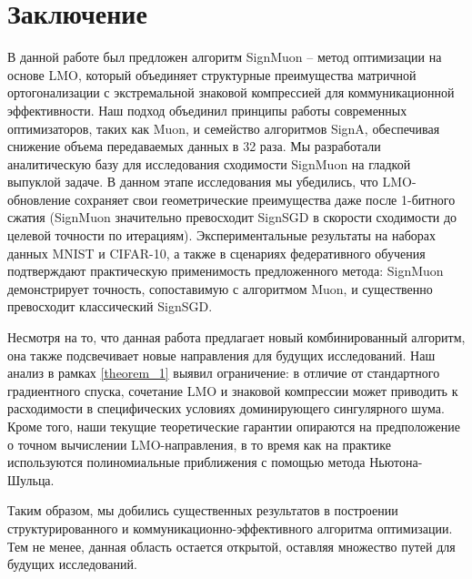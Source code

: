 \documentclass{article}
\begin{document}
\section{Заключение}
В данной работе был предложен алгоритм SignMuon -- метод оптимизации на основе LMO, который объединяет структурные преимущества матричной ортогонализации с экстремальной знаковой компрессией для коммуникационной эффективности. Наш подход объединил принципы работы современных оптимизаторов, таких как Muon, и семейство алгоритмов SignA, обеспечивая снижение объема передаваемых данных в 32 раза. Мы разработали аналитическую базу для исследования сходимости SignMuon на гладкой выпуклой задаче. В данном этапе исследования мы убедились, что LMO-обновление сохраняет свои геометрические преимущества даже после 1-битного сжатия (SignMuon значительно превосходит SignSGD в скорости сходимости до целевой точности по итерациям). Экспериментальные результаты на наборах данных MNIST и CIFAR-10, а также в сценариях федеративного обучения подтверждают практическую применимость предложенного метода: SignMuon демонстрирует точность, сопоставимую с алгоритмом Muon, и существенно превосходит классический SignSGD.

Несмотря на то, что данная работа предлагает новый комбинированный алгоритм, она также подсвечивает новые направления для будущих исследований. Наш анализ в рамках \cref{theorem_1} выявил ограничение: в отличие от стандартного градиентного спуска, сочетание LMO и знаковой компрессии может приводить к расходимости в специфических условиях доминирующего сингулярного шума. Кроме того, наши текущие теоретические гарантии опираются на предположение о точном вычислении LMO-направления, в то время как на практике используются полиномиальные приближения с помощью метода Ньютона-Шульца. 

Таким образом, мы добились существенных результатов в построении структурированного и коммуникационно-эффективного алгоритма оптимизации. Тем не менее, данная область остается открытой, оставляя множество путей для будущих исследований.






\end{document}
